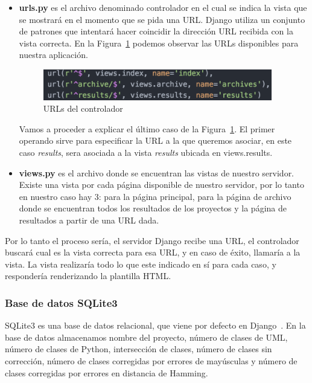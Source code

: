 \documentclass[a4paper, 12pt]{book}
\begin{document}
\begin{itemize}
\begin{itemize}
    \item \textbf{urls.py} es el archivo denominado controlador en el cual se indica la vista
    que se mostrará en el momento que se pida una URL. Django utiliza un conjunto de patrones que intentará
    hacer coincidir la dirección URL recibida con la vista correcta. En la Figura~\ref{fig:controlador-urls} podemos observar las URLs disponibles para nuestra aplicación.
    \begin{figure}[htb]
      \centering
      \includegraphics[width=10cm, keepaspectratio]{img/controlador-urls}
      \caption{URLs del controlador}
      \label{fig:controlador-urls}
    \end{figure}

    Vamos a proceder a explicar el último caso de la Figura~\ref{fig:controlador-urls}. El primer operando sirve para especificar la URL
    a la que queremos asociar, en este caso \textit{results}, sera asociada a la vista \emph{results} ubicada en views.results.
    \item \textbf{views.py} es el archivo donde se encuentran las vistas de nuestro servidor. Existe una vista por cada
    página disponible de nuestro servidor, por lo tanto en nuestro caso hay 3: para la página principal, para la página
    de archivo donde se encuentran todos los resultados de los proyectos y la página de resultados a partir de una URL
    dada.

  \end{itemize}
\end{itemize}

Por lo tanto el proceso sería, el servidor Django recibe una URL, el controlador buscará cual es la vista correcta
para esa URL, y en caso de éxito, llamaría a la vista. La vista realizaría todo lo que este indicado en sí para cada caso,
y respondería renderizando la plantilla HTML.

\subsubsection{Base de datos SQLite3}
\label{subsubsec:bbdd}

SQLite3 es una base de datos relacional, que viene por defecto en Django~\cite{owens2010sqlite}.
En la base de datos almacenamos nombre del proyecto, número de clases de UML,
número de clases de Python, intersección de clases, número de clases sin corrección, número de clases
corregidas por errores de mayúsculas y número de clases corregidas por errores en distancia de Hamming.
\end{document}
